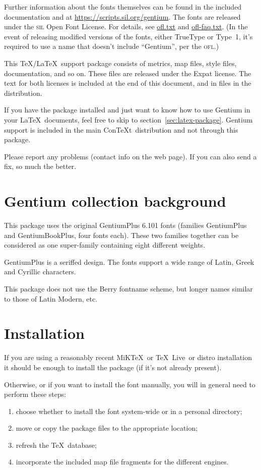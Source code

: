 \documentclass[12pt, english]{article}
\def\ConTeXt{Con{\TeX}t}
\def\TeXLive{\TeX~Live}
\def\MiKTeX{MiK\TeX}
\begin{document}
Further information about the fonts themselves can be found in the
included documentation and at \url{https://scripts.sil.org/gentium}. The
fonts are released under the \textsc{sil} Open Font License. For
details, see \url{ofl.txt} and \url{ofl-faq.txt}.  (In the event of
releasing modified versions of the fonts, either TrueType or Type~1,
it's required to use a name that doesn't include ``Gentium'', per the
\textsc{ofl}.)

This \TeX/\LaTeX\ support package consists of metrics, map
files, style files, documentation, and so on.  These files are released
under the Expat license.  The text for both licenses is included at the
end of this document, and in files in the distribution.

If you have the package installed and just want to know how to use
Gentium in your \LaTeX\ documents, feel free to skip to
section~\ref{sec:latex-package}. Gentium support is included in the main
\ConTeXt\ distribution and not through this package.

Please report any problems (contact info on the web page).  If you can
also send a fix, so much the better.


\section{Gentium collection background}

This package uses the original GentiumPlus 6.101 fonts (families
GentiumPlus and GentiumBookPlus, four fonts each). These two families
together can be considered as one super-family containing eight
different weights.

GentiumPlus is a seriffed design. The fonts support a wide range of
Latin, Greek and Cyrillic characters.

This package does not use the Berry fontname scheme, but longer names
similar to those of Latin Modern, etc.


\section{Installation}

If you are using a reasonably recent \MiKTeX\ or \TeXLive\ or distro
installation it should be enough to install the 
package (if it's not already present).

Otherwise, or if you want to install the font manually, you will in
general need to perform these steps:
\begin{enumerate}
\item choose whether to install the font system-wide or in a personal
      directory;
\item move or copy the package files to the appropriate location;
\item refresh the \TeX\ database;
\item incorporate the included map file fragments for the different
      engines.
\end{enumerate}
\end{document}
